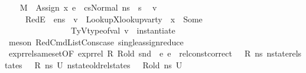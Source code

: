 \begin{isabellebody}
\ \ \isamarkupfalse%
\ {\isacartoucheopen}M{\isacharcomma}{\kern0pt}{\isasymLambda}{\isacharcomma}{\kern0pt}{\isasymGamma}{\isacharcomma}{\kern0pt}{\isasymOmega}\ {\isasymturnstile}\ {\isasymlangle}Assign\ x{}\ e{}\ {\isacharhash}{\kern0pt}\ cs{}{\isacharcomma}{\kern0pt}Normal\ ns{\isasymrangle}\ {\isacharbrackleft}{\kern0pt}{\isasymrightarrow}{\isacharbrackright}{\kern0pt}\ s{\isacharprime}{\kern0pt}{\isacartoucheclose}\ \isamarkupfalse%
\ v{}\ {\isasymtau}\isanewline
\ \ \ \ \ RedE{}{\isacharcolon}{\kern0pt}{\isachardoublequoteopen}{\isasymLambda}{\isacharcomma}{\kern0pt}{\isasymGamma}{\isacharcomma}{\kern0pt}{\isasymOmega}\ {\isasymturnstile}\ {\isasymlangle}e{}{\isacharcomma}{\kern0pt}ns{\isasymrangle}\ {\isasymDown}\ v{}{\isachardoublequoteclose}\ \ LookupX{}{\isacharcolon}{\kern0pt}{\isachardoublequoteopen}lookup{\isacharunderscore}{\kern0pt}var{\isacharunderscore}{\kern0pt}ty\ {\isasymLambda}\ x{}\ {\isacharequal}{\kern0pt}\ Some\ {\isasymtau}{\isachardoublequoteclose}\ \ \isanewline
\ \ \ \ \ \ \ \ \ \ \ \ \ \ \ \ TyV{}{\isacharcolon}{\kern0pt}{\isachardoublequoteopen}type{\isacharunderscore}{\kern0pt}of{\isacharunderscore}{\kern0pt}val\ v{}\ {\isacharequal}{\kern0pt}\ instantiate\ {\isasymOmega}\ {\isasymtau}{\isachardoublequoteclose}\ \isamarkupfalse%
\ {\isacharparenleft}{\kern0pt}meson\ RedCmdListCons{\isacharunderscore}{\kern0pt}case\ single{\isacharunderscore}{\kern0pt}assign{\isacharunderscore}{\kern0pt}reduce{\isacharunderscore}{\kern0pt}{}{\isacharparenright}{\kern0pt}\isanewline
\ \ \isamarkupfalse%
\ expr{\isacharunderscore}{\kern0pt}rel{\isacharunderscore}{\kern0pt}same{\isacharunderscore}{\kern0pt}set{\isacharbrackleft}{\kern0pt}OF\ {\isacartoucheopen}expr{\isacharunderscore}{\kern0pt}rel\ R\ R{\isacharunderscore}{\kern0pt}old\ {\isacharparenleft}{\kern0pt}snd\ {\isasymLambda}{\isacharparenright}{\kern0pt}\ e{}\ e{}{\isacartoucheclose}\ {\isacharunderscore}{\kern0pt}\ {\isacartoucheopen}rel{\isacharunderscore}{\kern0pt}const{\isacharunderscore}{\kern0pt}correct\ {\isasymLambda}\ {\isasymOmega}\ R\ ns{\isacartoucheclose}\ {\isacartoucheopen}nstate{\isacharunderscore}{\kern0pt}rel{\isacharunderscore}{\kern0pt}states\ {\isasymLambda}\ {\isasymLambda}{\isacharprime}{\kern0pt}\ R\ ns\ U{}{\isacartoucheclose}\ {\isacartoucheopen}nstate{\isacharunderscore}{\kern0pt}old{\isacharunderscore}{\kern0pt}rel{\isacharunderscore}{\kern0pt}states\ {\isasymLambda}\ {\isasymLambda}{\isacharprime}{\kern0pt}\ R{\isacharunderscore}{\kern0pt}old\ ns\ U{}{\isacartoucheclose}{\isacharbrackright}{\kern0pt}\isanewline

\end{isabellebody}
